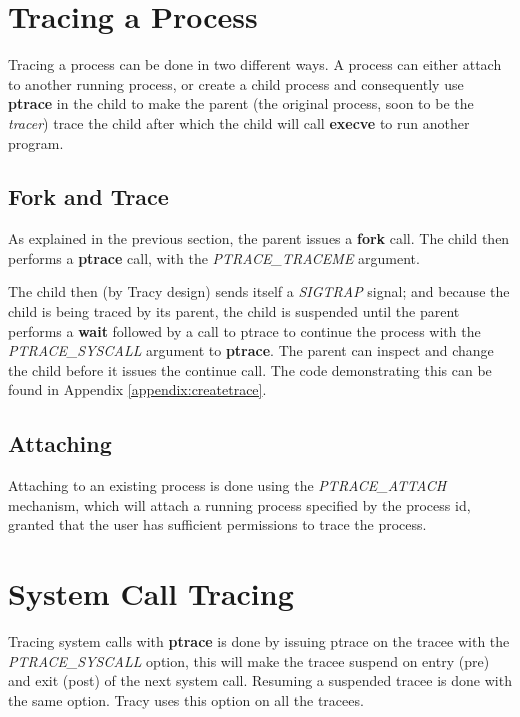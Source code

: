 \documentclass[a4paper, 10pt]{report}
\begin{document}
\section{Tracing a Process}

Tracing a process can be done in two different ways. A process can either attach
to another running process, or create a child process and consequently use
\textbf{ptrace} in the child to make the parent (the original process, soon to
be the \textit{tracer}) trace the child after which the child will
call \textbf{execve} to run another program.

\subsection{Fork and Trace}

As explained in the previous section, the parent issues a \textbf{fork} call.
The child then performs a \textbf{ptrace} call, with the \textit{PTRACE\_TRACEME} argument.

The child then (by Tracy design)  sends itself a \textit{SIGTRAP} signal;
and because the child is being traced by its parent, the child is
suspended until the parent performs a \textbf{wait} followed by a call
to ptrace to continue the process with the \textit{PTRACE\_SYSCALL} argument
to \textbf{ptrace}.
The parent can inspect and change the child before it issues
the continue call. The code demonstrating this can be found in
Appendix \ref{appendix:createtrace}.

\subsection{Attaching}

Attaching to an existing process is done using the \textit{PTRACE\_ATTACH}
mechanism, which will attach a running process specified by the process
id, granted that the user has sufficient permissions to trace the process.


\section{System Call Tracing}
\label{syscall-trace}

Tracing system calls with \textbf{ptrace} is done by issuing ptrace on the
tracee with the \textit{PTRACE\_SYSCALL} option, this will make the tracee
suspend on entry (pre) and exit (post) of the next system call. Resuming a
suspended tracee is done with the same option. Tracy uses this option on
all the tracees.
\end{document}
